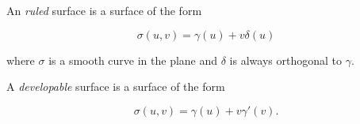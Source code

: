 \documentclass[11pt]{scrartcl}
\begin{document}
\begin{definition}
    An \emph{ruled} surface is a surface of the form
    
    \begin{equation}
        \sigma(u,v) = \gamma(u) + v \delta(u)
    \end{equation}

    where $\sigma$ is a smooth curve in the plane and $\delta$ is always orthogonal to $\gamma$.
\end{definition}

\begin{definition}
    A \emph{developable} surface is a surface of the form

    \begin{equation}
        \sigma(u,v) = \gamma(u) + v \gamma'(v).
    \end{equation}
\end{definition}
\end{document}
